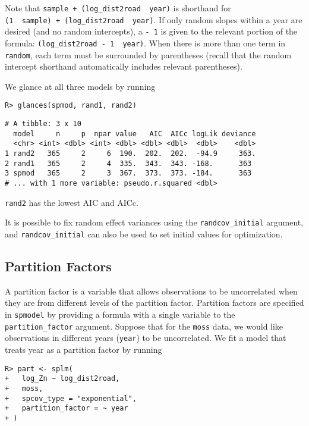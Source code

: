\documentclass[10pt,letterpaper]{article}
\begin{document}
Note that \texttt{sample\ +\ (log\_dist2road\ \textbar{}\ year)} is
shorthand for
\texttt{(1\ \textbar{}\ sample)\ +\ (log\_dist2road\ \textbar{}\ year)}.
If only random slopes within a year are desired (and no random
intercepts), a \texttt{-\ 1} is given to the relevant portion of the
formula: \texttt{(log\_dist2road\ -\ 1\ \textbar{}\ year)}. When there
is more than one term in \texttt{random}, each term must be surrounded
by parentheses (recall that the random intercept shorthand automatically
includes relevant parentheses).

We glance at all three models by running

\begin{verbatim}
R> glances(spmod, rand1, rand2)
\end{verbatim}

\begin{verbatim}
# A tibble: 3 x 10
  model     n     p  npar value   AIC  AICc logLik deviance
  <chr> <int> <dbl> <int> <dbl> <dbl> <dbl>  <dbl>    <dbl>
1 rand2   365     2     6  190.  202.  202.  -94.9     363.
2 rand1   365     2     4  335.  343.  343. -168.      363 
3 spmod   365     2     3  367.  373.  373. -184.      363 
# ... with 1 more variable: pseudo.r.squared <dbl>
\end{verbatim}

\texttt{rand2} has the lowest AIC and AICc.

It is possible to fix random effect variances using the
\texttt{randcov\_initial} argument, and \texttt{randcov\_initial} can
also be used to set initial values for optimization.

\hypertarget{partition-factors}{%
\subsection{Partition Factors}\label{partition-factors}}

A partition factor is a variable that allows observations to be
uncorrelated when they are from different levels of the partition
factor. Partition factors are specified in \texttt{spmodel} by providing
a formula with a single variable to the \texttt{partition\_factor}
argument. Suppose that for the \texttt{moss} data, we would like
observations in different years (\texttt{year}) to be uncorrelated. We
fit a model that treats year as a partition factor by running

\begin{verbatim}
R> part <- splm(
+   log_Zn ~ log_dist2road,
+   moss,
+   spcov_type = "exponential",
+   partition_factor = ~ year
+ )
\end{verbatim}
\end{document}
